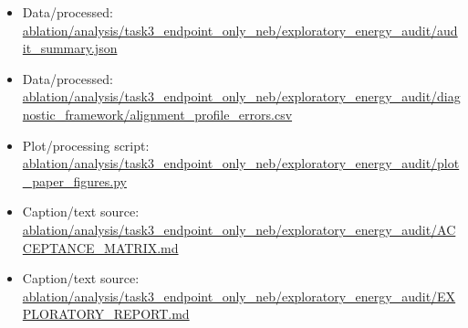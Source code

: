 \begin{itemize}[leftmargin=1.4em,noitemsep]
\item Data/processed: \begingroup\scriptsize\url{ablation/analysis/task3_endpoint_only_neb/exploratory_energy_audit/audit_summary.json}\endgroup
\item Data/processed: \begingroup\scriptsize\url{ablation/analysis/task3_endpoint_only_neb/exploratory_energy_audit/diagnostic_framework/alignment_profile_errors.csv}\endgroup
\item Plot/processing script: \begingroup\scriptsize\url{ablation/analysis/task3_endpoint_only_neb/exploratory_energy_audit/plot_paper_figures.py}\endgroup
\item Caption/text source: \begingroup\scriptsize\url{ablation/analysis/task3_endpoint_only_neb/exploratory_energy_audit/ACCEPTANCE_MATRIX.md}\endgroup
\item Caption/text source: \begingroup\scriptsize\url{ablation/analysis/task3_endpoint_only_neb/exploratory_energy_audit/EXPLORATORY_REPORT.md}\endgroup
\end{itemize}
